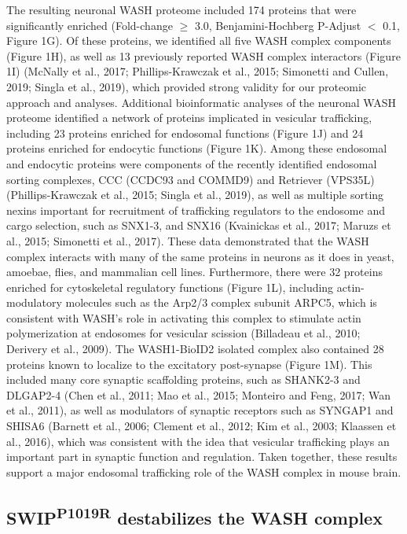 The resulting neuronal WASH proteome included 174 proteins that were
significantly enriched (Fold-change $\geq$ 3.0, 
Benjamini-Hochberg P-Adjust $<$ 0.1,
Figure 1G). Of these proteins, we identified all five WASH complex components
(Figure 1H), as well as 13 previously reported WASH complex interactors (Figure
1I)  (McNally et al., 2017; Phillips-Krawczak et al., 2015; Simonetti and
Cullen, 2019; Singla et al., 2019), which provided strong validity for our
proteomic approach and analyses. Additional bioinformatic analyses of the
neuronal WASH proteome identified a network of proteins implicated in vesicular
trafficking, including 23 proteins enriched for endosomal functions (Figure 1J)
and 24 proteins enriched for endocytic functions (Figure 1K). Among these
endosomal and endocytic proteins were components of the recently identified
endosomal sorting complexes, CCC (CCDC93 and COMMD9) and Retriever (VPS35L)
(Phillips-Krawczak et al., 2015; Singla et al., 2019), as well as multiple
sorting nexins important for recruitment of trafficking regulators to the
endosome and cargo selection, such as SNX1-3, and SNX16 (Kvainickas et al.,
2017; Maruzs et al., 2015; Simonetti et al., 2017). These data demonstrated that
the WASH complex interacts with many of the same proteins in neurons as it does
in yeast, amoebae, flies, and mammalian cell lines. Furthermore, there were 32
proteins enriched for cytoskeletal regulatory functions (Figure 1L), including
actin-modulatory molecules such as the Arp2/3 complex subunit ARPC5, which is
consistent with WASH’s role in activating this complex to stimulate actin
polymerization at endosomes for vesicular scission (Billadeau et al., 2010;
Derivery et al., 2009). The WASH1-BioID2 isolated complex also contained 28
proteins known to localize to the excitatory post-synapse (Figure 1M). This
included many core synaptic scaffolding proteins, such as SHANK2-3 and DLGAP2-4
(Chen et al., 2011; Mao et al., 2015; Monteiro and Feng, 2017; Wan et al.,
2011), as well as modulators of synaptic receptors such as SYNGAP1 and SHISA6
(Barnett et al., 2006; Clement et al., 2012; Kim et al., 2003; Klaassen et al.,
2016), which was consistent with the idea that vesicular trafficking plays an
important part in synaptic function and regulation. Taken together, these
results support a major endosomal trafficking role of the WASH complex in mouse
brain. 

\subsection{SWIP\textsuperscript{P1019R} destabilizes the WASH complex}


